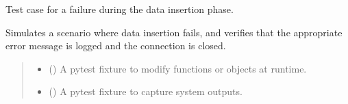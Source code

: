 \documentclass[letterpaper,10pt,english]{sphinxmanual}
\begin{document}
\begin{fulllineitems}
\label{\detokenize{test.data_storage:test.data_storage.test_create_table.test_create_table_insert_failure}}
\pysigstartsignatures
\pysiglinewithargsret
{}
{\sphinxparamcomma {}}
{}
\pysigstopsignatures
\sphinxAtStartPar
Test case for a failure during the data insertion phase.

\sphinxAtStartPar
Simulates a scenario where data insertion fails, and verifies that the
appropriate error message is logged and the connection is closed.
\begin{quote}\begin{description}
\begin{itemize}
\item {} 
\sphinxAtStartPar
{} () \textendash{} A pytest fixture to modify functions or objects at runtime.

\item {} 
\sphinxAtStartPar
{} () \textendash{} A pytest fixture to capture system outputs.

\end{itemize}

\end{description}\end{quote}

\end{fulllineitems}

\end{document}
